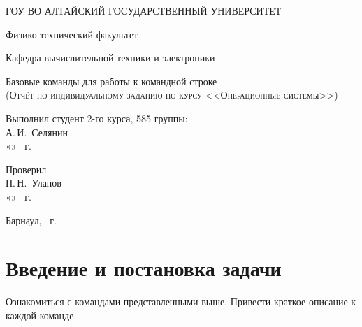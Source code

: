 \documentclass[a4paper,14pt]{extarticle}
\begin{document}
\begin{titlepage}
  \begin{center}
    ГОУ ВО АЛТАЙСКИЙ ГОСУДАРСТВЕННЫЙ УНИВЕРСИТЕТ
    \vspace{0.25cm}
    
    Физико-технический факультет
    
    Кафедра вычислительной техники и электроники
    \vfill
    
    {\LARGE Базовые команды для работы к командной строке}\\[5mm]
    \textsc{(Отчёт по индивидуальному заданию по курсу <<Операционные системы>>)}
  \bigskip

\end{center}
\vfill

\newlength{\ML}
\hfill\begin{minipage}{0.4\textwidth}
  Выполнил студент 2-го курса, 585 группы:\\
  \underline{\hspace{\ML}} А.\,И.~Селянин\\
  «\underline{\hspace{0.7cm}}» \underline{\hspace{2cm}} \the\year~г.
\end{minipage}%
\bigskip

\hfill\begin{minipage}{0.4\textwidth}
  Проверил\\
  \underline{\hspace{\ML}} П.\,Н.~Уланов\\
  «\underline{\hspace{0.7cm}}» \underline{\hspace{2cm}} \the\year~г.
\end{minipage}%
\vfill

\begin{center}
  Барнаул, \the\year~г.
\end{center}
\end{titlepage}


\tableofcontents

\section{Введение и постановка задачи}
Ознакомиться с командами представленными выше. Привести краткое описание к каждой команде.
\end{document}
